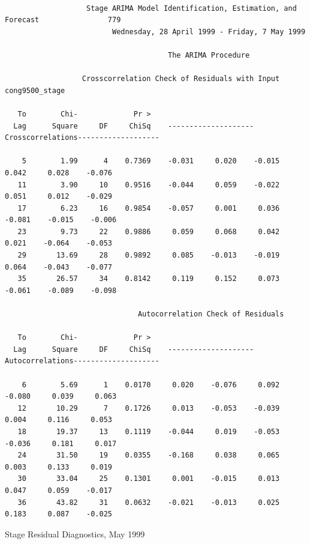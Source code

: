 \documentclass[12pt]{report}
\begin{document}
\begin{table} \scriptsize
\begin{centering}
\begin{verbatim}

                   Stage ARIMA Model Identification, Estimation, and Forecast                779
                         Wednesday, 28 April 1999 - Friday, 7 May 1999

                                      The ARIMA Procedure

                  Crosscorrelation Check of Residuals with Input cong9500_stage

   To        Chi-             Pr >
  Lag      Square     DF     ChiSq    --------------------Crosscorrelations-------------------

    5        1.99      4    0.7369    -0.031     0.020    -0.015     0.042     0.028    -0.076
   11        3.90     10    0.9516    -0.044     0.059    -0.022     0.051     0.012    -0.029
   17        6.23     16    0.9854    -0.057     0.001     0.036    -0.081    -0.015    -0.006
   23        9.73     22    0.9886     0.059     0.068     0.042     0.021    -0.064    -0.053
   29       13.69     28    0.9892     0.085    -0.013    -0.019     0.064    -0.043    -0.077
   35       26.57     34    0.8142     0.119     0.152     0.073    -0.061    -0.089    -0.098

                               Autocorrelation Check of Residuals

   To        Chi-             Pr >
  Lag      Square     DF     ChiSq    --------------------Autocorrelations--------------------

    6        5.69      1    0.0170     0.020    -0.076     0.092    -0.080     0.039     0.063
   12       10.29      7    0.1726     0.013    -0.053    -0.039     0.004     0.116     0.053
   18       19.37     13    0.1119    -0.044     0.019    -0.053    -0.036     0.181     0.017
   24       31.50     19    0.0355    -0.168     0.038     0.065     0.003     0.133     0.019
   30       33.04     25    0.1301     0.001    -0.015     0.013     0.047     0.059    -0.017
   36       43.82     31    0.0632    -0.021    -0.013     0.025     0.183     0.087    -0.025

\end{verbatim}
\end{centering}\normalsize\caption{Stage Residual Diagnostics, May 1999}
\end{table}
\end{document}
